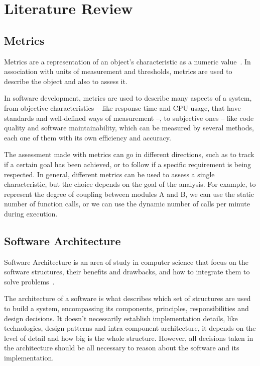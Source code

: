 

\chapter{Literature Review}
\label{cap:literature}

\enlargethispage{.5\baselineskip}

\section{Metrics}
\label{sec:metrics}
Metrics are a representation of an object’s characteristic as a numeric value~\cite{OOMetrics}. In association with units of measurement and thresholds, metrics are used to describe the object and also to assess it.

In software development, metrics are used to describe many aspects of a system, from objective characteristics – like response time and CPU usage, that have standards and well-defined ways of measurement –, to subjective ones – like code quality and software maintainability, which can be measured by several methods, each one of them with its own efficiency and accuracy.

The assessment made with metrics can go in different directions, such as to track if a certain goal has been achieved, or to follow if a specific requirement is being respected. In general, different metrics can be used to assess a single characteristic, but the choice depends on the goal of the analysis. For example, to represent the degree of coupling between modules A and B, we can use the static number of function calls, or we can use the dynamic number of calls per minute during execution.

\section{Software Architecture}
\label{sec:softarq}
Software Architecture is an area of study in computer science that focus on the software structures, their benefits and drawbacks, and how to integrate them to solve problems~\cite{SoftArch}.

The architecture of a software is what describes which set of structures are used to build a system, encompassing its components, principles, responsibilities and design decisions. It doesn't necessarily establish implementation details, like technologies, design patterns and intra-component architecture, it depends on the level of detail and how big is the whole structure. However, all decisions taken in the architecture should be all necessary to reason about the software and its implementation.

